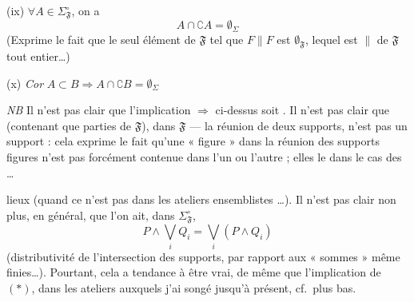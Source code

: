 \documentclass[11pt,a4paper]{article}
\begin{document}
(ix) $\forall A \in \Sigma^{\circ}_{\mathfrak{F}}$, on a
\[
  A \cap \complement A = \emptyset_{\Sigma}
\]
 (Exprime le fait que le seul élément de $\mathfrak{F}$ \struck{\ill{}} tel que $F \parallel F$ est $\emptyset_{\mathfrak{F}}$, lequel est $\parallel$ de $\mathfrak{F}$ tout entier…)

(x) \emph{Cor} $A \subset B \Longrightarrow A \cap \complement B = \emptyset_{\Sigma}$

\emph{NB} Il n'est pas clair que l'implication $\Rightarrow$ ci-dessus soit  . \struck{\ill{}} Il n'est  pas clair que     \ill{} (contenant que parties de $\mathfrak{F}$),  dans $\mathfrak{F}$ — la réunion de deux supports, n'est pas  un support : cela exprime le fait  qu'une « figure »  dans la réunion des supports \add{[\ill{} \ill{}]} \ill{} figures n'est pas forcément contenue dans l'un ou l'autre ; elles le  dans le cas des …

lieux (quand ce n'est pas dans les ateliers ensemblistes …). Il n'est pas clair non plus, en général, que l'on ait, dans $\Sigma^{\circ}_{\mathfrak{F}}$,
\[
  P \wedge \bigvee_i Q_i = \bigvee_i (P \wedge Q_i)
\]
(distributivité de l'intersection des supports, par rapport aux « sommes » même finies…). Pourtant, cela a tendance à être vrai, de même que l'implication  de $(*)$, dans les  ateliers auxquels j'ai songé jusqu'à présent, cf.\ plus bas.
\end{document}
